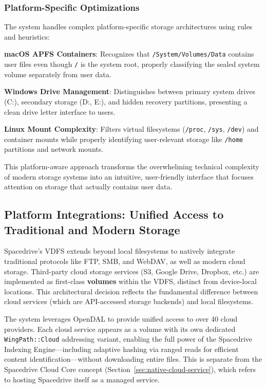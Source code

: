 \documentclass[sigconf]{acmart}
\begin{document}
\subsubsection{Platform-Specific Optimizations}
The system handles complex platform-specific storage architectures using rules and heuristics:

\textbf{macOS APFS Containers}: Recognizes that \texttt{/System/Volumes/Data} contains user files even though \texttt{/} is the system root, properly classifying the sealed system volume separately from user data.

\textbf{Windows Drive Management}: Distinguishes between primary system drives (C:), secondary storage (D:, E:), and hidden recovery partitions, presenting a clean drive letter interface to users.

\textbf{Linux Mount Complexity}: Filters virtual filesystems (\texttt{/proc}, \texttt{/sys}, \texttt{/dev}) and container mounts while properly identifying user-relevant storage like \texttt{/home} partitions and network mounts.

This platform-aware approach transforms the overwhelming technical complexity of modern storage systems into an intuitive, user-friendly interface that focuses attention on storage that actually contains user data.


\subsection{Platform Integrations: Unified Access to Traditional and Modern Storage}
\label{sec:platform-integrations}

Spacedrive's VDFS extends beyond local filesystems to natively integrate traditional protocols like FTP, SMB, and WebDAV, as well as modern cloud storage. Third-party cloud storage services (S3, Google Drive, Dropbox, etc.) are implemented as first-class \textbf{volumes} within the VDFS, distinct from device-local locations. This architectural decision reflects the fundamental difference between cloud services (which are API-accessed storage backends) and local filesystems.

The system leverages OpenDAL to provide unified access to over 40 cloud providers. Each cloud service appears as a volume with its own dedicated \texttt{WingPath::Cloud} addressing variant, enabling the full power of the Spacedrive Indexing Engine—including adaptive hashing via ranged reads for efficient content identification—without downloading entire files. This is separate from the Spacedrive Cloud Core concept (Section~\ref{sec:native-cloud-service}), which refers to hosting Spacedrive itself as a managed service.
\end{document}
